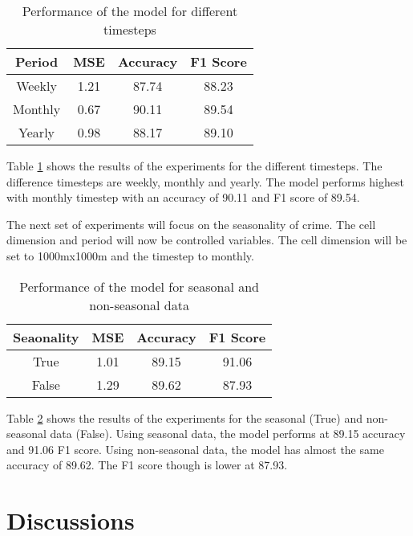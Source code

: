     \begin{table}[H]
      \centering
      \begin{tabular}{|c|c|c|c|}
            \hline
          \textbf{Period}  &\textbf{MSE}  &\textbf{Accuracy} &\textbf{F1 Score}\\ 
          \hline
          Weekly &1.21 &87.74 &88.23 \\
          Monthly &0.67 &90.11 &89.54 \\
          Yearly   &0.98 &88.17 &89.10 \\
          \hline
        \end{tabular}
      \caption{Performance of the model for different timesteps}
      \label{table:timestep-results}
    \end{table}
    Table \ref{table:timestep-results} shows the results of the experiments for the different timesteps. The difference timesteps are weekly, monthly and yearly. The model performs highest with monthly timestep with an accuracy of 90.11 and F1 score of 89.54.

    The next set of experiments will focus on the seasonality of crime. The cell dimension and period will now be controlled variables. The cell dimension will be set to 1000mx1000m and the timestep to monthly.

    \begin{table}[H]
      \centering
      \begin{tabular}{|c|c|c|c|}
            \hline
          \textbf{Seaonality}  &\textbf{MSE}  &\textbf{Accuracy} &\textbf{F1 Score}\\ 
          \hline
          True &1.01 &89.15 &91.06\\
          False  &1.29 &89.62 &87.93 \\
          \hline
        \end{tabular}
      \caption{Performance of the model for seasonal and non-seasonal data}
      \label{table:seasonal-results}
    \end{table}
    Table \ref{table:seasonal-results} shows the results of the experiments for the seasonal (True) and non-seasonal data (False). Using seasonal data, the model performs at 89.15 accuracy and 91.06 F1 score. Using non-seasonal data, the model has almost the same accuracy of 89.62. The F1 score though is lower at 87.93.

\section{Discussions}

